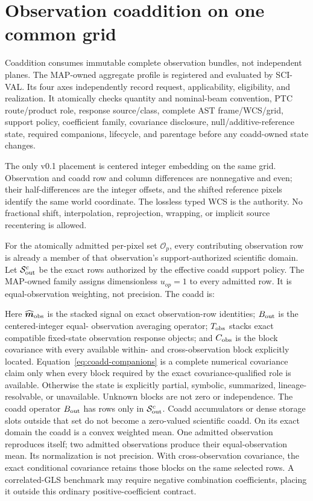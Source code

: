 \documentclass[10pt]{article}
\begin{document}
\clearpage
\section{Observation coaddition on one common grid}

Coaddition consumes immutable complete observation bundles, not independent
planes. The MAP-owned aggregate profile
\SCIMapCoaddProfile{} is registered and evaluated by
SCI-VAL. Its four axes independently record request, applicability,
eligibility, and realization. It atomically checks quantity
and nominal-beam convention, PTC route/product role, response source/class,
complete AST frame/WCS/grid, support policy, coefficient family, covariance
disclosure, null/additive-reference state, required companions, lifecycle,
and parentage before any coadd-owned state changes.

The only v0.1 placement is centered integer embedding on the same grid.
Observation and coadd row and column differences are nonnegative and even;
their half-differences are the integer offsets, and the shifted reference
pixels identify the same world coordinate. The lossless typed WCS is the
authority. No fractional shift, interpolation, reprojection, wrapping, or
implicit source recentering is allowed.

For the atomically admitted per-pixel set \(\mathcal O_p\), every contributing
observation row is already a member of that observation's support-authorized
scientific domain. Let \(\mathcal S^c_{\rm out}\) be the exact rows authorized
by the effective coadd support policy. The MAP-owned family
\SCIMapUniformCoaddProfile{} assigns dimensionless
\(u_{op}=1\) to every admitted row. It is equal-observation weighting, not
precision. The coadd is:

\SCIMapCoaddEquations

Here \(\widehat{\boldsymbol m}_{\rm obs}\) is the stacked signal on exact
observation-row identities; \(B_{\rm out}\) is the centered-integer equal-
observation averaging operator; \(T_{\rm obs}\) stacks exact compatible
fixed-state observation response objects; and \(C_{\rm obs}\) is the block covariance with
every available within- and cross-observation block explicitly located.
Equation~\eqref{eq:coadd-companions} is a complete numerical covariance claim
only when every block required by the exact covariance-qualified role is
available. Otherwise the state is explicitly partial, symbolic, summarized,
lineage-resolvable, or unavailable. Unknown blocks are not zero or
independence. The coadd operator \(B_{\rm out}\) has rows only in
\(\mathcal S^c_{\rm out}\). Coadd accumulators or dense storage slots outside
that set do not become a zero-valued scientific coadd. On its exact domain the
coadd is a convex weighted mean. One admitted observation reproduces itself;
two admitted observations produce their equal-observation mean. Its
normalization is not precision. With cross-observation covariance, the exact
conditional covariance retains those blocks on the same selected rows. A
correlated-GLS benchmark may require negative combination coefficients,
placing it outside this ordinary positive-coefficient contract.
\end{document}
